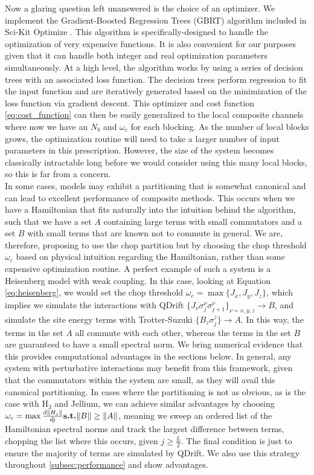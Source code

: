 Now a glaring question left unanswered is the choice of an optimizer. We implement the Gradient-Boosted Regression Trees (GBRT) algorithm included in Sci-Kit Optimize \cite{pedregosa2011scikit}. This algorithm is specifically-designed to handle the optimization of very expensive functions. It is also convenient for our purposes given that it can handle both integer and real optimization parameters simultaneously. At a high level, the algorithm works by using a series of decision trees with an associated loss function. The decision trees perform regression to fit the input function and are iteratively generated based on the minimization of the loss function via gradient descent. This optimizer and cost function \ref{eq:cost_function} can then be easily generalized to the local composite channels where now we have an $N_b$ and $\omega_c$ for each blocking. As the number of local blocks grows, the optimization routine will need to take a larger number of input parameters in this prescription. However, the size of the system becomes classically intractable long before we would consider using this many local blocks, so this is far from a concern. \\

In some cases, models may exhibit a partitioning that is somewhat canonical and can lead to excellent performance of composite methods. This occurs when we have a Hamiltonian that fits naturally into the intuition behind the algorithm, such that we have a set $A$ containing large terms with small commutators and a set $B$ with small terms that are known not to commute in general. We are, therefore, proposing to use the chop partition but by choosing the chop threshold $\omega_c$ based on physical intuition regarding the Hamiltonian, rather than some expensive optimization routine. A perfect example of such a system is a Heisenberg model with weak coupling. In this case, looking at Equation \ref{eq:heisenberg}, we would set the chop threshold $\omega_c = \max\{J_x, J_y, J_z\}$, which implies we simulate the interactions with QDrift $\{J_\nu \sigma_j^\nu \sigma_{j+1}^\nu\}_{\nu = x,y,z} \rightarrow B$, and simulate the site energy terms with Trotter-Suzuki $\{B_z \sigma_j^z\} \rightarrow A$. In this way, the terms in the set $A$ all commute with each other, whereas the terms in the set $B$ are guaranteed to have a small spectral norm. We bring numerical evidence that this provides computational advantages in the sections below. In general, any system with perturbative interactions may benefit from this framework, given that the commutators within the system are small, as they will avail  this canonical partitioning. In cases where the partitioning is not as obvious, as is the case with {\rm H$_3$} and Jellium, we can achieve similar advantages by choosing $\omega_c = \max \frac{d \norm{H_j}}{dj} \textbf{s.t.} \norm{B} \geq \norm{A}$, meaning we sweep an ordered list of the Hamiltonian spectral norms and track the largest difference between terms, chopping the list where this occurs, given $j\geq \frac{L}{2}$. The final condition is just to ensure the majority of terms are simulated by QDrift. We also use this strategy throughout \ref{subsec:performance} and show advantages. 

